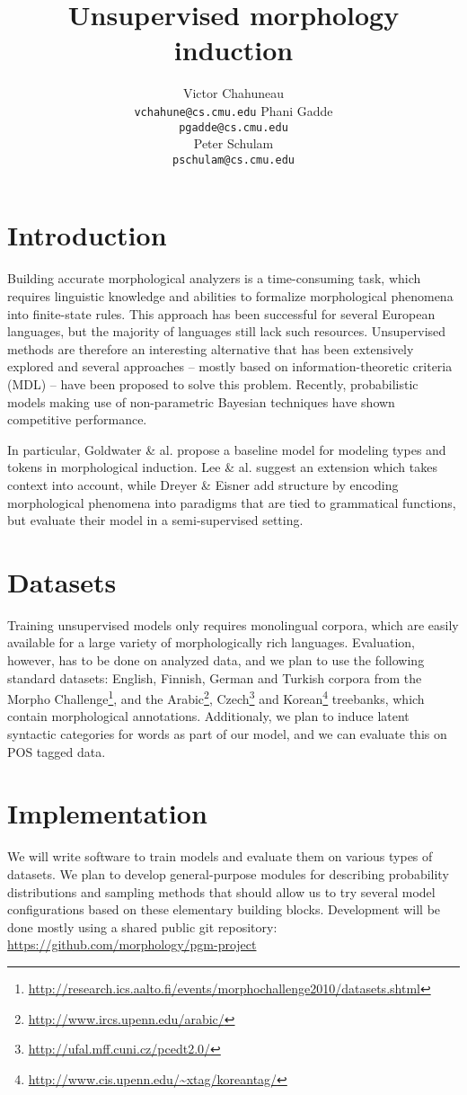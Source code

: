 \documentclass{article}
\title{Unsupervised morphology induction}
\author{
Victor Chahuneau\\
\texttt{vchahune@cs.cmu.edu}
\And
Phani Gadde\\
\texttt{pgadde@cs.cmu.edu} \\
\And
Peter Schulam\\
\texttt{pschulam@cs.cmu.edu}
}
\begin{document}
\maketitle

\section{Introduction}
Building accurate morphological analyzers is a time-consuming task, which requires linguistic knowledge and abilities to formalize morphological phenomena into finite-state rules. This approach has been successful for several European languages, but the majority of languages still lack such resources. Unsupervised methods are therefore an interesting alternative that has been extensively explored  and several approaches -- mostly based on information-theoretic criteria (MDL) -- have been proposed to solve this problem. Recently, probabilistic models making use of non-parametric Bayesian techniques have shown competitive performance.

In particular, Goldwater \& al. \cite{goldwater2011} propose a baseline model for modeling types and tokens in morphological induction. Lee \& al. \cite{lee2011} suggest an extension which takes context into account, while Dreyer \& Eisner \cite{dreyer2011} add structure by encoding morphological phenomena into paradigms that are tied to grammatical functions, but evaluate their model in a semi-supervised setting.

\section{Datasets}
Training unsupervised models only requires monolingual corpora, which are easily available for a large variety of morphologically rich languages. Evaluation, however, has to be done on analyzed data, and we plan to use the following standard datasets: English, Finnish, German and Turkish corpora from the Morpho Challenge\footnote{\url{http://research.ics.aalto.fi/events/morphochallenge2010/datasets.shtml}}, and the Arabic\footnote{\url{http://www.ircs.upenn.edu/arabic/}}, Czech\footnote{\url{http://ufal.mff.cuni.cz/pcedt2.0/}} and Korean\footnote{\url{http://www.cis.upenn.edu/~xtag/koreantag/}} treebanks, which contain morphological annotations. Additionaly, we plan to induce latent syntactic categories for words as part of our model, and we can evaluate this on POS tagged data.

\section{Implementation}
We will write software to train models and evaluate them on various types of datasets. We plan to develop general-purpose modules for describing probability distributions and sampling methods that should allow us to try several model configurations based on these elementary building blocks. Development will be done mostly using a shared public git repository: \url{https://github.com/morphology/pgm-project}
\end{document}
